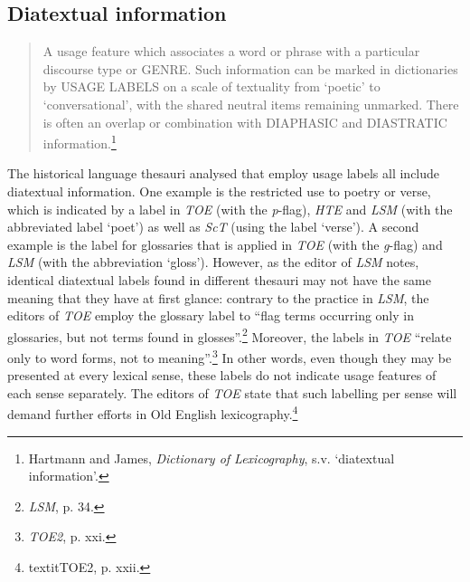 \subsection*{Diatextual information}
\begin{quotation} \noindent
A usage feature which associates a word or phrase with a particular discourse type or GENRE. Such information can be marked in dictionaries by USAGE LABELS on a scale of textuality from `poetic' to `conversational', with the shared neutral items remaining unmarked. There is often an overlap or combination with DIAPHASIC and DIASTRATIC information.\footnote{Hartmann and James, \textit{Dictionary of Lexicography}, s.v. `diatextual information'.}
\end{quotation}
The historical language thesauri analysed that employ usage labels all include diatextual information. One example is the restricted use to poetry or verse, which is indicated by a label in \textit{TOE} (with the \textit{p}-flag), \textit{HTE} and \textit{LSM} (with the abbreviated label `poet') as well as \textit{ScT} (using the label `verse'). A second example is the label for glossaries that is applied in \textit{TOE} (with the \textit{g}-flag) and \textit{LSM} (with the abbreviation `gloss'). However, as the editor of \textit{LSM} notes, identical diatextual labels found in different thesauri may not have the same meaning that they have at first glance: contrary to the practice in \textit{LSM}, the editors of \textit{TOE} employ the glossary label to ``flag terms occurring only in glossaries, but not terms found in glosses''.\footnote{\textit{LSM}, p. 34.} Moreover, the labels in \textit{TOE} ``relate only to word forms, not to meaning''.\footnote{\textit{TOE2}, p. xxi.} In other words, even though they may be presented at every lexical sense, these labels do not indicate usage features of each sense separately. The editors of \textit{TOE} state that such labelling per sense will demand further efforts in Old English lexicography.\footnote{textit{TOE2}, p. xxii.}

